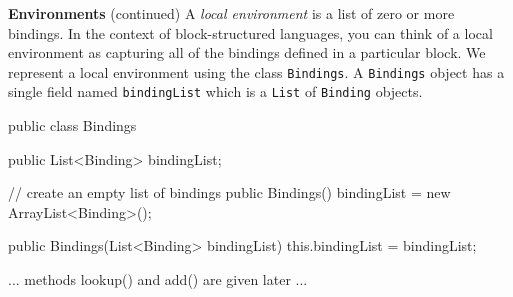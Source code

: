 \begin{minipage}[t]{\sw}
\slidenumber
\LARGE
{\bf Environments} (continued)\exx
A {\em local environment} is a list of zero or more bindings.
In the context of block-structured languages,
you can think of a local environment
as capturing all of the bindings defined in a particular block.
We represent a local environment using the class \verb'Bindings'.
A \verb'Bindings' object has a single field named \verb'bindingList'
which is a \verb'List' of \verb'Binding' objects.
{\Large
\begin{qv}
public class Bindings {

    public List<Binding> bindingList;

    // create an empty list of bindings
    public Bindings() {
        bindingList = new ArrayList<Binding>();
    }

    public Bindings(List<Binding> bindingList) {
        this.bindingList = bindingList;
    }

    ... methods lookup() and add() are given later ...

}
\end{qv}
}
\end{minipage}
\clearpage
